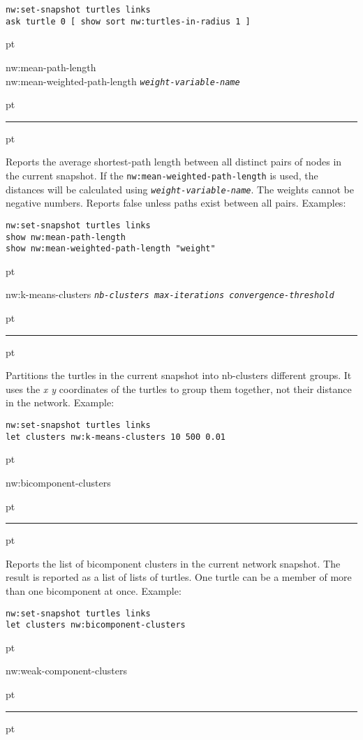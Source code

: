 \documentclass[10pt]{article}
\newenvironment{prim}{
  \leftskip 0cm
  \vskip 6 pt
  \ttfamily
  \bfseries
}{
  \vskip 2 pt
  \hrule
  \vskip 6 pt
}
\newcommand{\param}[1]{\texttt{\textit{\textmd{#1}}}}
\newcommand{\cat}[1]{\vspace{1 em}{\parindent -1cm \scshape \bfseries \large
#1}}
\begin{document}
\begin{Verbatim}
nw:set-snapshot turtles links
ask turtle 0 [ show sort nw:turtles-in-radius 1 ]
\end{Verbatim}


\begin{prim}
nw:mean-path-length\\
nw:mean-weighted-path-length \param{weight-variable-name}
\end{prim}

Reports the average shortest-path length between all distinct pairs of nodes in
the current snapshot. If the \texttt{nw:mean-weighted-path-length} is used, the
distances will be calculated using \param{weight-variable-name}. The weights
cannot be negative numbers. Reports false unless paths exist between all pairs.
Examples:

\begin{Verbatim}
nw:set-snapshot turtles links
show nw:mean-path-length
show nw:mean-weighted-path-length "weight"
\end{Verbatim}

\cat{Clusterers and Clique Finder Primitives}

\begin{prim}
nw:k-means-clusters \param{nb-clusters max-iterations
convergence-threshold}
\end{prim}

Partitions the turtles in the current snapshot into nb-clusters different
groups. It uses the \emph{x y} coordinates of the turtles to group them together, not
their distance in the network. Example:

\begin{Verbatim}
nw:set-snapshot turtles links
let clusters nw:k-means-clusters 10 500 0.01
\end{Verbatim}

\begin{prim}
nw:bicomponent-clusters
\end{prim}

Reports the list of bicomponent clusters in the current network snapshot. The
result is reported as a list of lists of turtles. One turtle can be a member of
more than one bicomponent at once. Example:

\begin{Verbatim}
nw:set-snapshot turtles links
let clusters nw:bicomponent-clusters
\end{Verbatim}

\begin{prim}
nw:weak-component-clusters
\end{prim}
\end{document}
